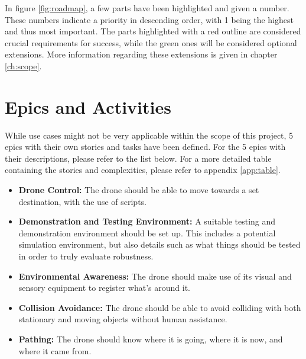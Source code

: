 \noindent
In figure \ref{fig:roadmap}, a few parts have been highlighted and given a number. These numbers indicate a priority in descending order, with 1 being the highest and thus most important. The parts highlighted with a red outline are considered crucial requirements for success, while the green ones will be considered optional extensions. More information regarding these extensions is given in chapter \ref{ch:scope}.

\section{Epics and Activities}
While use cases might not be very applicable within the scope of this project, 5 epics with their own stories and tasks have been defined. For the 5 epics with their descriptions, please refer to the list below. For a more detailed table containing the stories and complexities, please refer to appendix \ref{app:table}.
\begin{itemize}
	\item \textbf{Drone Control:} The drone should be able to move towards a set destination, with the use of scripts.
	\item \textbf{Demonstration and Testing Environment:} A suitable testing and demonstration environment should be set up. This includes a potential simulation environment, but also details such as what things should be tested in order to truly evaluate robustness.
	\item \textbf{Environmental Awareness:} The drone should make use of its visual and sensory equipment to register what's around it.
	\item \textbf{Collision Avoidance:} The drone should be able to avoid colliding with both stationary and moving objects without human assistance.
	\item \textbf{Pathing:} The drone should know where it is going, where it is now, and where it came from.
\end{itemize}
\pagebreak